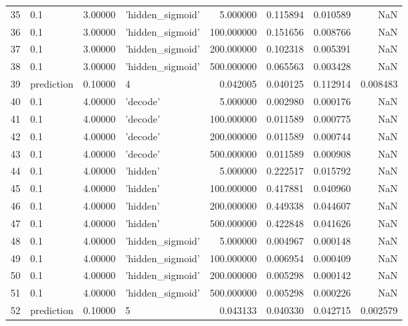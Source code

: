 \documentclass[10pt,a4paper]{article}
\begin{document}
\begin{tabular}{llrlrrrr}
35   &         0.1 &   3.00000 &   'hidden\_sigmoid' &    5.000000 &  0.115894 &  0.010589 &       NaN \\
36   &         0.1 &   3.00000 &   'hidden\_sigmoid' &  100.000000 &  0.151656 &  0.008766 &       NaN \\
37   &         0.1 &   3.00000 &   'hidden\_sigmoid' &  200.000000 &  0.102318 &  0.005391 &       NaN \\
38   &         0.1 &   3.00000 &   'hidden\_sigmoid' &  500.000000 &  0.065563 &  0.003428 &       NaN \\
39   &  prediction &   0.10000 &                  4 &    0.042005 &  0.040125 &  0.112914 &  0.008483 \\
40   &         0.1 &   4.00000 &           'decode' &    5.000000 &  0.002980 &  0.000176 &       NaN \\
41   &         0.1 &   4.00000 &           'decode' &  100.000000 &  0.011589 &  0.000775 &       NaN \\
42   &         0.1 &   4.00000 &           'decode' &  200.000000 &  0.011589 &  0.000744 &       NaN \\
43   &         0.1 &   4.00000 &           'decode' &  500.000000 &  0.011589 &  0.000908 &       NaN \\
44   &         0.1 &   4.00000 &           'hidden' &    5.000000 &  0.222517 &  0.015792 &       NaN \\
45   &         0.1 &   4.00000 &           'hidden' &  100.000000 &  0.417881 &  0.040960 &       NaN \\
46   &         0.1 &   4.00000 &           'hidden' &  200.000000 &  0.449338 &  0.044607 &       NaN \\
47   &         0.1 &   4.00000 &           'hidden' &  500.000000 &  0.422848 &  0.041626 &       NaN \\
48   &         0.1 &   4.00000 &   'hidden\_sigmoid' &    5.000000 &  0.004967 &  0.000148 &       NaN \\
49   &         0.1 &   4.00000 &   'hidden\_sigmoid' &  100.000000 &  0.006954 &  0.000409 &       NaN \\
50   &         0.1 &   4.00000 &   'hidden\_sigmoid' &  200.000000 &  0.005298 &  0.000142 &       NaN \\
51   &         0.1 &   4.00000 &   'hidden\_sigmoid' &  500.000000 &  0.005298 &  0.000226 &       NaN \\
52   &  prediction &   0.10000 &                  5 &    0.043133 &  0.040330 &  0.042715 &  0.002579 \\

\end{tabular}
\end{document}
